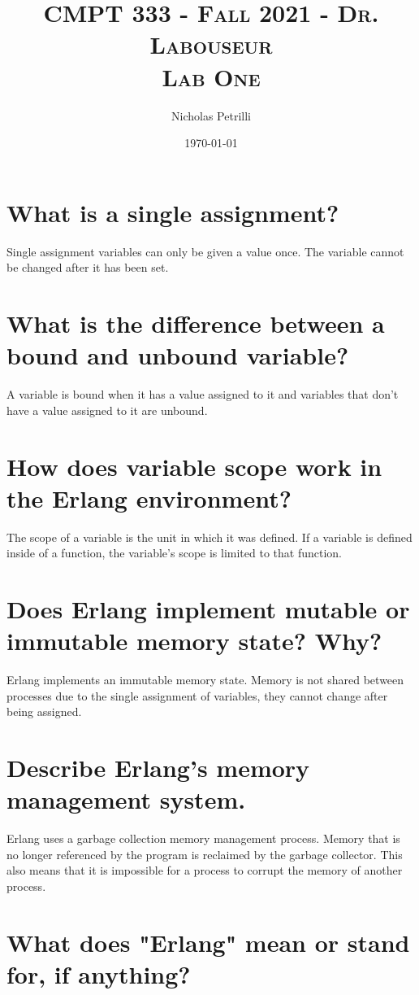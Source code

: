 \documentclass{article}
\author{Nicholas Petrilli }
\title{	
   \normalfont \normalsize 
   \textsc{CMPT 333 - Fall 2021 - Dr. Labouseur} \\[10pt] %
   \textsc{Lab One}
}
\date{\today}
\begin{document}
\maketitle

\section{What is a single assignment?}


\noindent
Single assignment variables can only be given a value once. The variable cannot be changed after it has been set. 

\section{What is the difference between a bound and unbound variable?}

A variable is bound when it has a value assigned to it and variables that don't have a value assigned to it are unbound. 

\section{How does variable scope work in the Erlang environment?}

\noindent
The scope of a variable is the unit in which it was defined. If a variable is defined inside of a function, the variable's scope is limited to that function. 

\section{Does Erlang implement mutable or immutable memory state? Why?}

\noindent
Erlang implements an immutable memory state. Memory is not shared between processes due to the single assignment of variables, they cannot change after being assigned. 

\section{Describe Erlang's memory management system.}

\noindent
Erlang uses a garbage collection memory management process. Memory that is no longer referenced by the program is reclaimed by the garbage collector. This also means that it is impossible for a process to corrupt the memory of another process. 

\section{What does "Erlang" mean or stand for, if anything?}
\end{document}
